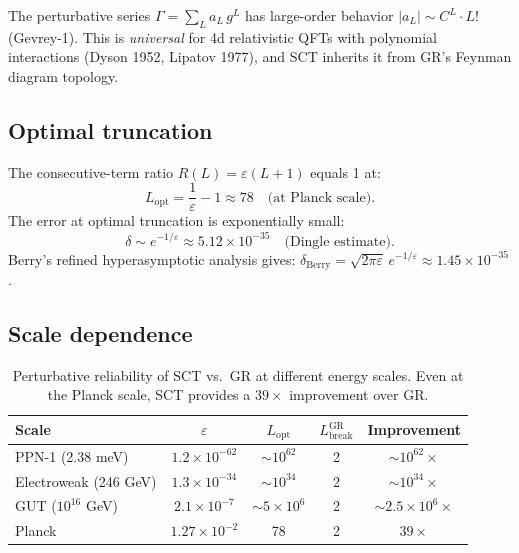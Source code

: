 \documentclass[12pt,a4paper]{article}
\begin{document}
The perturbative series $\Gamma = \sum_L a_L\,g^L$ has large-order behavior
$|a_L| \sim C^L \cdot L!$ (Gevrey-1). This is \emph{universal} for
4d relativistic QFTs with polynomial interactions (Dyson 1952, Lipatov 1977),
and SCT inherits it from GR's Feynman diagram topology.

\subsection{Optimal truncation}

The consecutive-term ratio $R(L) = \varepsilon(L+1)$ equals 1 at:
\begin{equation}\label{eq:Lopt}
  L_{\mathrm{opt}} = \frac{1}{\varepsilon} - 1 \approx 78
  \quad\text{(at Planck scale)}.
\end{equation}
The error at optimal truncation is exponentially small:
\begin{equation}\label{eq:error}
  \delta \sim e^{-1/\varepsilon} \approx 5.12 \times 10^{-35}
  \quad\text{(Dingle estimate)}.
\end{equation}
Berry's refined hyperasymptotic analysis gives:
$\delta_{\mathrm{Berry}} = \sqrt{2\pi\varepsilon}\,e^{-1/\varepsilon}
\approx 1.45 \times 10^{-35}$.

\subsection{Scale dependence}

\begin{table}[H]
\centering
\begin{tabular}{lcccc}
\toprule
Scale & $\varepsilon$ & $L_{\mathrm{opt}}$ & $L_{\mathrm{break}}^{\mathrm{GR}}$ & Improvement \\
\midrule
PPN-1 (2.38 meV) & $1.2 \times 10^{-62}$ & $\sim 10^{62}$ & 2 & $\sim 10^{62}\times$ \\
Electroweak (246 GeV) & $1.3 \times 10^{-34}$ & $\sim 10^{34}$ & 2 & $\sim 10^{34}\times$ \\
GUT ($10^{16}$ GeV) & $2.1 \times 10^{-7}$ & $\sim 5 \times 10^{6}$ & 2 & $\sim 2.5 \times 10^{6}\times$ \\
Planck & $1.27 \times 10^{-2}$ & 78 & 2 & $39\times$ \\
\bottomrule
\end{tabular}
\caption{Perturbative reliability of SCT vs.\ GR at different energy scales.
Even at the Planck scale, SCT provides a $39\times$ improvement over GR.}
\label{tab:scales}
\end{table}
\end{document}
